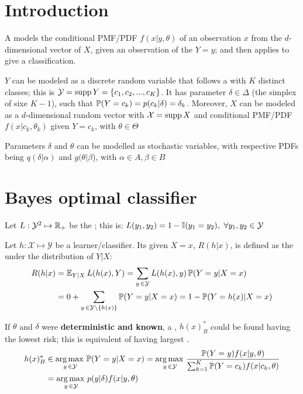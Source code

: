 \section{Introduction}

A  models the conditional PMF/PDF $f(x|y,{\theta})$ of an observation $x$ from the $d$-dimensional vector of  $X$, given an observation of the  $Y=y$; and then applies  to give a classification. 

$Y$ can be modeled as a discrete random variable that follows a 
 with $K$ distinct classes; this is $ \mathcal{Y}=\operatorname{supp}{Y}=\{c_1,c_2,...,c_K\}$. It has parameter $\delta\in\Delta$ (the simplex of sixe $K-1$), such that $\operatorname{\mathbb{P}}(Y=c_k)=p(c_k|\delta)=\delta_k$. Moreover, $X$ can be modeled as a $d$-dimensional random vector with $\mathcal{X}=\operatorname{supp} X$ and conditional PMF/PDF $f(x|c_k,{\theta}_k)$ given $Y=c_k$, with $\theta\in\Theta$

Parameters $\delta$ and $\theta$ can be modelled as stochastic variables, with respective PDFs being $q(\delta|\alpha)$ and $g(\theta|\beta$), with  $\alpha\in A,\beta\in B$

\section{Bayes optimal classifier}

Let $L:\mathcal{Y}^2\mapsto\operatorname{\mathbb{R}}_+$ be the ; this is: $L(y_1,y_2) = 1-\I(y_1=y_2),\ \forall y_1,y_2\in\mathcal{Y}$

Let $h:\mathcal{X}\mapsto\mathcal{Y}$ be a {learner}/{classifier}. Its  given $X=x$, $R(h|x)$, is defined as the  under the distribution of $Y|X$:
\begin{align*}
    R(h|x) &= \operatorname{\mathbb{E}}_{Y|X} L(h(x),Y) = \sum_{y\,\in\mathcal{Y}} L(h({x}),y)\operatorname{\mathbb{P}}(Y=y|X={x}) \\
    &= 0+\sum_{y\,\in\mathcal{Y}\setminus\{h({x})\} } \operatorname{\mathbb{P}}(Y=y|X={x}) = 1 - \operatorname{\mathbb{P}}(Y=h(x)|X={x})
\end{align*}

If $\theta$ and $\delta$ were \textbf{deterministic and known}, a , $h(x)^*_B$ could be found having the lowest risk; this is equivalent of having largest .
\begin{align*}
    h(x)^*_B &\in   \operatorname*{arg\,max\,}_{y\,\in\mathcal{Y}}\operatorname{\mathbb{P}}(Y=y|X={x}) = \operatorname*{arg\,max\,}_{y\,\in\mathcal{Y}} \frac{\operatorname{\mathbb{P}}(Y=y)f(x|y,\theta)}{\sum_{k=1}^K \operatorname{\mathbb{P}}(Y=c_k)f(x|c_k,\theta)} \\ &= \operatorname*{arg\,max\,}_{y\,\in\mathcal{Y}} p(y|\delta)f(x|y,\theta)
\end{align*}

